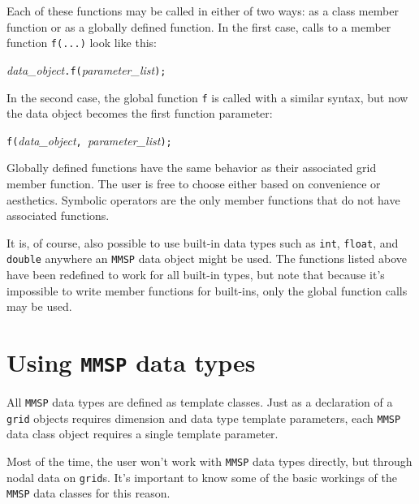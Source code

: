 Each of these functions may be called in either of two ways: as a class member function or as a globally defined function.  In the first case, calls to a member function {\tt f(...)} look like this:
\begin{center}
{\it data\_object}{\tt .f(}{\it parameter\_list}{\tt );}
\end{center}
In the second case, the global function {\tt f} is called with a similar syntax, but now the data object becomes the first function parameter:
\begin{center}
{\tt f(}{\it data\_object}{\tt, }{\it parameter\_list}{\tt );}
\end{center}
Globally defined functions have the same behavior as their associated grid member function.  The user is free to choose either based on convenience or aesthetics.  Symbolic operators are the only member functions that do not have associated functions.

It is, of course, also possible to use built-in data types such as {\tt int}, {\tt float}, and {\tt double} anywhere an {\tt MMSP} data object might be used.  The functions listed above have been redefined to work for all built-in types, but note that because it's impossible to write member functions for built-ins, only the global function calls may be used.

\section{Using {\tt MMSP} data types}
All {\tt MMSP} data types are defined as template classes.  Just as a declaration of a {\tt grid} objects requires dimension and data type template parameters, each {\tt MMSP} data class object requires a single template parameter.

Most of the time, the user won't work with {\tt MMSP} data types directly, but through nodal data on {\tt grid}s.  It's important to know some of the basic workings of the {\tt MMSP} data classes for this reason.

